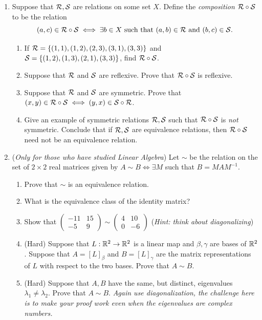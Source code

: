 \begin{exercises}{}{}
\begin{enumerate}
	\item Suppose that $\mathcal{R},\mathcal{S}$ are relations on some set $X$. Define the \emph{composition} $\mathcal{R}\circ \mathcal{S}$ to be the relation
	\[(a,c)\in \mathcal{R}\circ \mathcal{S}\iff \exists b\in X\text{ such that }(a,b)\in \mathcal{R}\text{ and }(b,c)\in \mathcal{S}.\]
	\begin{enumerate}
		\item If $\mathcal{R}=\{(1,1),(1,2),(2,3),(3,1),(3,3)\}$ and $\mathcal{S}=\{(1,2),(1,3),(2,1),(3,3)\}$, find $\mathcal{R}\circ \mathcal{S}$.
		\item Suppose that $\mathcal{R}$ and $\mathcal{S}$ are reflexive. Prove that $\mathcal{R}\circ \mathcal{S}$ is reflexive.
		\item Suppose that $\mathcal{R}$ and $\mathcal{S}$ are symmetric. Prove that $(x,y)\in \mathcal{R}\circ \mathcal{S}\iff (y,x)\in \mathcal{S}\circ \mathcal{R}$.
		\item Give an example of symmetric relations $\mathcal{R},\mathcal{S}$ such that $\mathcal{R}\circ \mathcal{S}$ is \emph{not} symmetric. Conclude that if $\mathcal{R},\mathcal{S}$ are equivalence relations, then $\mathcal{R}\circ \mathcal{S}$ need not be an equivalence relation.
	\end{enumerate}

  \item (\emph{Only for those who have studied Linear Algebra}) Let $\sim$ be the relation on the set of $2\times 2$ real matrices given by $A\sim B\iff\exists M$ such that $B=MAM^{-1}$.
  \begin{enumerate}
    \item Prove that $\sim$ is an equivalence relation.
    \item What is the equivalence class of the identity matrix?
    \item Show that $\left(\begin{smallmatrix}
    -11&15\\-5&9
    \end{smallmatrix}\right)\sim \left(\begin{smallmatrix}
    4&10\\0&-6
    \end{smallmatrix}\right)$ (\emph{Hint: think about diagonalizing})
    \item (Hard) Suppose that $L:\mathbb{R}^2\to\mathbb{R}^2$ is a linear map and $\beta,\gamma$ are bases of $\mathbb{R}^2$. Suppose that $A=[L]_\beta$ and $B=[L]_\gamma$ are the matrix representations of $L$ with respect to the two bases. Prove that $A\sim B$.
    \item (Hard) Suppose that $A,B$ have the same, but distinct, eigenvalues $\lambda_1\neq\lambda_2$. Prove that $A\sim B$. \emph{Again use diagonalization, the challenge here is to make your proof work even when the eigenvalues are complex numbers.}
	\end{enumerate}
\end{enumerate}

\end{exercises}
\clearpage



